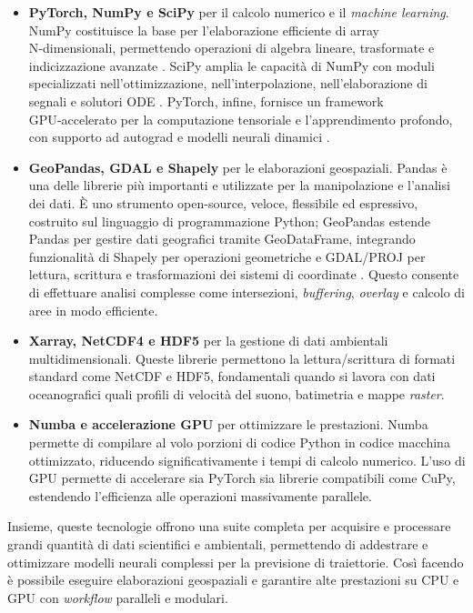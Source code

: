 \begin{itemize}
  \item \textbf{PyTorch, NumPy e SciPy} per il calcolo numerico e il \textit{machine learning}. 
    NumPy costituisce la base per l'elaborazione efficiente di array N‑dimensionali, permettendo operazioni di algebra lineare, trasformate e indicizzazione avanzate \cite{walt2011numpy}. SciPy amplia le capacità di NumPy con moduli specializzati nell'ottimizzazione, nell'interpolazione, nell'elaborazione di segnali e solutori ODE \cite{virtanen2020scipy}. PyTorch, infine, fornisce un framework GPU‑accelerato per la computazione tensoriale e l'apprendimento profondo, con supporto ad autograd e modelli neurali dinamici \cite{paszke2019pytorch}.

  \item \textbf{GeoPandas, GDAL e Shapely} per le elaborazioni geospaziali. Pandas è una delle librerie più importanti e utilizzate per la manipolazione e l'analisi dei dati. È uno strumento open-source, veloce, flessibile ed espressivo, costruito sul linguaggio di programmazione Python; GeoPandas estende Pandas per gestire dati geografici tramite GeoDataFrame, integrando funzionalità di Shapely per operazioni geometriche e GDAL/PROJ per lettura, scrittura e trasformazioni dei sistemi di coordinate \cite{geopandas2025}. Questo consente di effettuare analisi complesse come intersezioni, \textit{buffering}, \textit{overlay} e calcolo di aree in modo efficiente.

  \item \textbf{Xarray, NetCDF4 e HDF5} per la gestione di dati ambientali multidimensionali. Queste librerie permettono la lettura/scrittura di formati standard come NetCDF e HDF5, fondamentali quando si lavora con dati oceanografici quali profili di velocità del suono, batimetria e mappe \textit{raster}.

  \item \textbf{Numba e accelerazione GPU} per ottimizzare le prestazioni. Numba permette di compilare al volo porzioni di codice Python in codice macchina ottimizzato, riducendo significativamente i tempi di calcolo numerico. L'uso di GPU permette di accelerare sia PyTorch sia librerie compatibili come CuPy, estendendo l'efficienza alle operazioni massivamente parallele.
\end{itemize}

Insieme, queste tecnologie offrono una suite completa per acquisire e processare grandi quantità di dati scientifici e ambientali, permettendo di addestrare e ottimizzare modelli neurali complessi per la previsione di traiettorie. Così facendo è possibile eseguire elaborazioni geospaziali e garantire alte prestazioni su CPU e GPU con \textit{workflow} paralleli e modulari.

